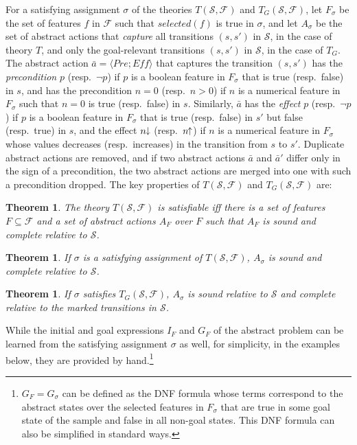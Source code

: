 \documentclass[letterpaper]{article} %
\newcommand{\tup}[1]{\langle #1 \rangle}
\newtheorem{theorem}[definition]{Theorem}
\newcommand{\F}{\mathcal{F}}
\renewcommand{\S}{\mathcal{S}}
\newcommand{\Eff}{{\mathit{Eff}}}
\newcommand{\abst}[2]{\tup{#1;#2}}
\newcommand{\pplus}{\hspace{-.05em}\raisebox{.15ex}{\footnotesize$\uparrow$}}
\newcommand{\mminus}{\hspace{-.05em}\raisebox{.15ex}{\footnotesize$\downarrow$}}
\begin{document}
For a satisfying assignment $\sigma$ of the theories $T(\S,\F)$ and $T_G(\S,\F)$, let
$F_{\sigma}$ be the set of features $f$ in $\F$ such that $selected(f)$
is true in $\sigma$, and let $A_{\sigma}$ be the set of abstract actions
that \emph{capture} all transitions $(s,s')$ in $\S$, in the case of theory $T$,
and only the goal-relevant transitions $(s,s')$ in $\S$, in the case of $T_G$.
The abstract action $\bar{a}=\abst{Pre}{\Eff}$ that captures the transition $(s,s')$
has the \emph{precondition} $p$ (resp.\ $\neg p$) if $p$ is a boolean feature in
$F_{\sigma}$ that is true (resp.\ false) in $s$, and has the precondition $n=0$
(resp.\ $n > 0$) if $n$ is a numerical feature in $F_{\sigma}$ such that $n=0$
is true (resp.\ false) in $s$. Similarly, $\bar{a}$ has the \emph{effect} $p$
(resp.\ $\neg p$) if $p$ is a boolean feature in $F_{\sigma}$ that is true
(resp.\ false) in $s'$ but false (resp.\ true) in $s$, and the effect $n\mminus$
(resp.\ $n\pplus$) if $n$ is a numerical feature in $F_{\sigma}$ whose values
decreases (resp.\ increases) in the transition from $s$ to $s'$.
Duplicate abstract actions are removed, and if two abstract actions $\bar{a}$ and $\bar{a}'$
differ only in the sign of a precondition, the two abstract actions are    merged into one with
such a  precondition dropped. The key properties of $T(\S,\F)$ and $T_G(\S,\F)$ are:

\begin{theorem}
  The theory $T(\S,\F)$ is satisfiable iff there is a set of features $F \subseteq \F$
  and a set of abstract actions $A_F$ over $F$ such that $A_F$ is sound and complete relative to  $\S$.
\end{theorem}

\begin{theorem}
  If $\sigma$ is a satisfying assignment of $T(\S,\F)$,   $A_{\sigma}$ is sound and complete relative to $\S$.
\end{theorem}

\begin{theorem}
  If $\sigma$ satisfies  $T_G(\S,\F)$, $A_{\sigma}$  is sound relative to $\S$ and complete relative to the marked
  transitions in $\S$. 
\end{theorem}

While the initial and goal expressions $I_F$ and $G_F$ of the abstract problem can be learned 
from the satisfying assignment $\sigma$ as well, for simplicity, in the examples below, they are
provided by hand.\footnote{$G_F = G_{\sigma}$ can be defined as the DNF formula
whose terms  correspond to the abstract states over the selected features in $F_{\sigma}$ 
that are true in some  goal state of the sample  and false in all non-goal states.
This DNF formula can also  be simplified in standard ways.}
\end{document}
